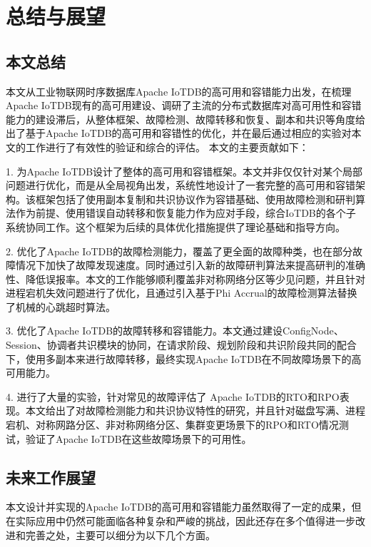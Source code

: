 
\chapter{总结与展望}


\section{本文总结}

本文从工业物联网时序数据库Apache IoTDB的高可用和容错能力出发，在梳理Apache IoTDB现有的高可用建设、调研了主流的分布式数据库对高可用性和容错能力的建设滞后，从整体框架、故障检测、故障转移和恢复、副本和共识等角度给出了基于Apache IoTDB的高可用和容错性的优化，并在最后通过相应的实验对本文的工作进行了有效性的验证和综合的评估。
本文的主要贡献如下：

1. 为Apache IoTDB设计了整体的高可用和容错框架。本文并非仅仅针对某个局部问题进行优化，而是从全局视角出发，系统性地设计了一套完整的高可用和容错架构。该框架包括了使用副本复制和共识协议作为容错基础、使用故障检测和研判算法作为前提、使用错误自动转移和恢复能力作为应对手段，综合IoTDB的各个子系统协同工作。这个框架为后续的具体优化措施提供了理论基础和指导方向。


2. 优化了Apache IoTDB的故障检测能力，覆盖了更全面的故障种类，也在部分故障情况下加快了故障发现速度。同时通过引入新的故障研判算法来提高研判的准确性、降低误报率。本文的工作能够顺利覆盖非对称网络分区等少见问题，并且针对进程宕机失效问题进行了优化，且通过引入基于Phi Accrual的故障检测算法替换了机械的心跳超时算法。


3. 优化了Apache IoTDB的故障转移和容错能力。本文通过建设ConfigNode、Session、协调者共识模块的协同，在请求阶段、规划阶段和共识阶段共同的配合下，使用多副本来进行故障转移，最终实现Apache IoTDB在不同故障场景下的高可用能力。

4. 进行了大量的实验，针对常见的故障评估了 Apache IoTDB的RTO和RPO表现。本文给出了对故障检测能力和共识协议特性的研究，并且针对磁盘写满、进程宕机、对称网路分区、非对称网络分区、集群变更场景下的RPO和RTO情况测试，验证了Apache IoTDB在这些故障场景下的可用性。


\section{未来工作展望}

本文设计并实现的Apache IoTDB的高可用和容错能力虽然取得了一定的成果，但在实际应用中仍然可能面临各种复杂和严峻的挑战，因此还存在多个值得进一步改进和完善之处，主要可以细分为以下几个方面。

